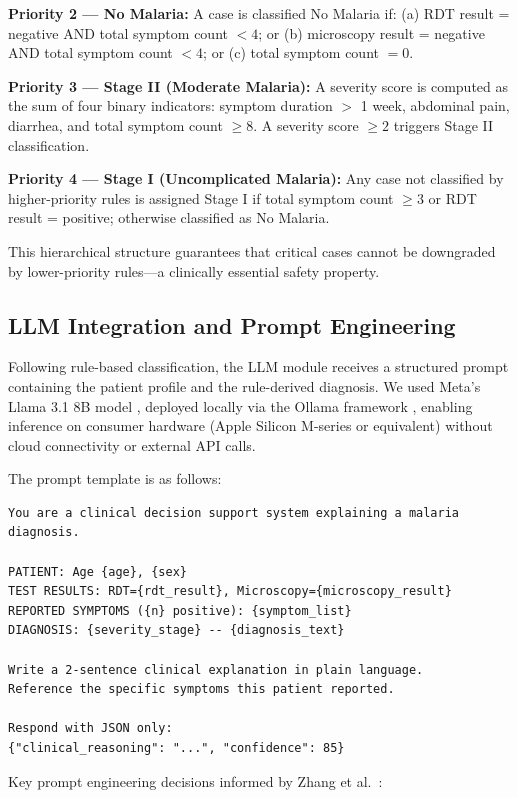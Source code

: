 \documentclass[12pt,a4paper]{article}
\begin{document}
\textbf{Priority 2 --- No Malaria:}
A case is classified No Malaria if: (a) RDT result = negative AND total symptom count $< 4$; or (b) microscopy result = negative AND total symptom count $< 4$; or (c) total symptom count $= 0$.

\textbf{Priority 3 --- Stage II (Moderate Malaria):}
A severity score is computed as the sum of four binary indicators: symptom duration $>$ 1 week, abdominal pain, diarrhea, and total symptom count $\geq 8$. A severity score $\geq 2$ triggers Stage II classification.

\textbf{Priority 4 --- Stage I (Uncomplicated Malaria):}
Any case not classified by higher-priority rules is assigned Stage I if total symptom count $\geq 3$ or RDT result = positive; otherwise classified as No Malaria.

This hierarchical structure guarantees that critical cases cannot be downgraded by lower-priority rules---a clinically essential safety property.

\subsection{LLM Integration and Prompt Engineering}

Following rule-based classification, the LLM module receives a structured prompt containing the patient profile and the rule-derived diagnosis. We used Meta's Llama 3.1 8B model \cite{ref9}, deployed locally via the Ollama framework \cite{ref13}, enabling inference on consumer hardware (Apple Silicon M-series or equivalent) without cloud connectivity or external API calls.

The prompt template is as follows:

\begin{lstlisting}[caption={LLM prompt template},label={lst:prompt}]
You are a clinical decision support system explaining a malaria diagnosis.

PATIENT: Age {age}, {sex}
TEST RESULTS: RDT={rdt_result}, Microscopy={microscopy_result}
REPORTED SYMPTOMS ({n} positive): {symptom_list}
DIAGNOSIS: {severity_stage} -- {diagnosis_text}

Write a 2-sentence clinical explanation in plain language.
Reference the specific symptoms this patient reported.

Respond with JSON only:
{"clinical_reasoning": "...", "confidence": 85}
\end{lstlisting}

Key prompt engineering decisions informed by Zhang et al.\ \cite{ref17}:
\end{document}

